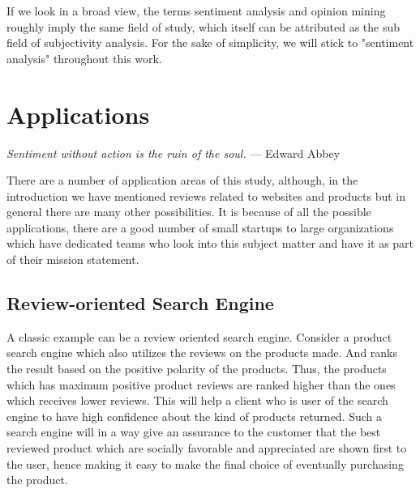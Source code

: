 If we look in a broad view, the terms sentiment analysis and opinion mining roughly imply the same field of study, which itself can be attributed as the sub field of subjectivity analysis. For the sake of simplicity, we will stick to "sentiment analysis" throughout this work. 

\section{Applications}
\begin{center}

\textit{Sentiment without action is the ruin of the soul. }— Edward Abbey

\end{center}

There are a number of application areas of this study, although, in the introduction we have mentioned reviews related to websites and products but in general there are many other possibilities. It is because of all the possible applications, there are a good number of small startups to large organizations which have dedicated teams who look into this subject matter and have it as part of their mission statement.


\subsection{Review-oriented Search Engine}
A classic example can be a review oriented search engine. Consider a product search engine which also utilizes the reviews on the products made. And ranks the result based on the positive polarity of the products. Thus, the products which has maximum positive  product reviews are ranked higher than the ones which receives lower reviews. This will help a client who is user of the search engine to have high confidence about the kind of products returned. Such a search engine will in a way give an assurance to the customer that the best reviewed product which are socially favorable and appreciated are shown first to the user, hence making it easy to make the final choice of eventually purchasing the product. 

